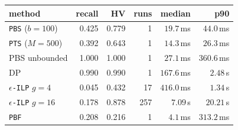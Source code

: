 \setlength{\tabcolsep}{3.5pt}%
\begin{tabular}{lrrrrr}
\toprule
method & recall & HV & runs & median & p90 \\
\midrule
\texttt{PBS} ($b{=}100$) & 0.425 & 0.779 & 1 & $19.7$\,ms & $44.0$\,ms \\
\texttt{PTS} ($M{=}500$) & 0.392 & 0.643 & 1 & $14.3$\,ms & $26.3$\,ms \\
PBS unbounded & 1.000 & 1.000 & 1 & $27.1$\,ms & $360.6$\,ms \\
\midrule
DP & 0.990 & 0.990 & 1 & $167.6$\,ms & $2.48$\,s \\
\texttt{$\epsilon$-ILP} $g{=}4$ & 0.045 & 0.432 & 17 & $416.0$\,ms & $1.34$\,s \\
\texttt{$\epsilon$-ILP} $g{=}16$ & 0.178 & 0.878 & 257 & $7.09$\,s & $20.21$\,s \\
\texttt{PBF} & 0.208 & 0.216 & 1 & $4.1$\,ms & $313.2$\,ms \\
\bottomrule
\end{tabular}
